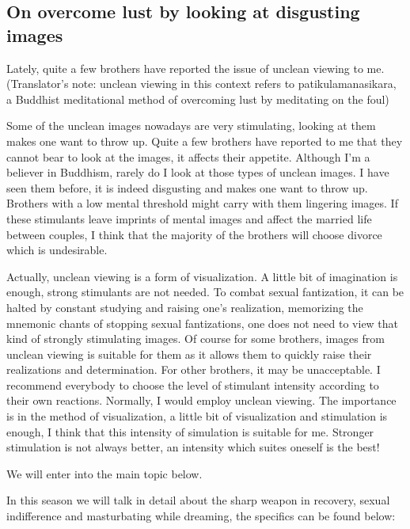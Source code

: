 \documentclass[
]{book}
\begin{document}
\hypertarget{on-overcome-lust-by-looking-at-disgusting-images}{%
\subsection{On overcome lust by looking at disgusting images}\label{on-overcome-lust-by-looking-at-disgusting-images}}

Lately, quite a few brothers have reported the issue of unclean viewing to me. (Translator's note: unclean viewing in this context refers to patikulamanasikara, a Buddhist meditational method of overcoming lust by meditating on the foul)

Some of the unclean images nowadays are very stimulating, looking at them makes one want to throw up. Quite a few brothers have reported to me that they cannot bear to look at the images, it affects their appetite. Although I'm a believer in Buddhism, rarely do I look at those types of unclean images. I have seen them before, it is indeed disgusting and makes one want to throw up. Brothers with a low mental threshold might carry with them lingering images. If these stimulants leave imprints of mental images and affect the married life between couples, I think that the majority of the brothers will choose divorce which is undesirable.

Actually, unclean viewing is a form of visualization. A little bit of imagination is enough, strong stimulants are not needed. To combat sexual fantization, it can be halted by constant studying and raising one's realization, memorizing the mnemonic chants of stopping sexual fantizations, one does not need to view that kind of strongly stimulating images. Of course for some brothers, images from unclean viewing is suitable for them as it allows them to quickly raise their realizations and determination. For other brothers, it may be unacceptable. I recommend everybody to choose the level of stimulant intensity according to their own reactions. Normally, I would employ unclean viewing. The importance is in the method of visualization, a little bit of visualization and stimulation is enough, I think that this intensity of simulation is suitable for me. Stronger stimulation is not always better, an intensity which suites oneself is the best!

We will enter into the main topic below.

In this season we will talk in detail about the sharp weapon in recovery, sexual indifference and masturbating while dreaming, the specifics can be found below:
\end{document}

